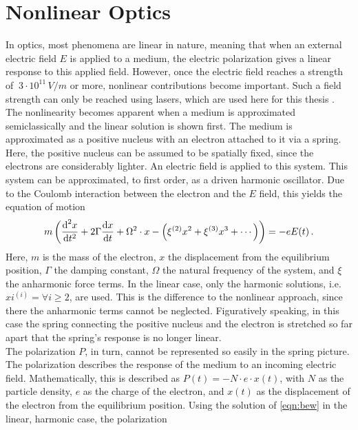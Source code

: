 \section{Nonlinear Optics}
\label{sec:NLO}
In optics, most phenomena are linear in nature, meaning that when an external electric field
$E$ is applied to a medium, the electric polarization gives a linear response to this applied
field.
However, once the electric field reaches a strength of $~3\cdot10^{11}\,\unit{V/m}$ or more,
nonlinear contributions become important.
Such a field strength can only be reached using lasers, which are used here for this
thesis \cite{Butcher_Cotter_1990}.
The nonlinearity becomes apparent when a medium is approximated semiclassically and the linear
solution is shown first.
The medium is approximated as a positive nucleus with an electron attached to it via a spring.
Here, the positive nucleus can be assumed to be spatially fixed, since the electrons are
considerably lighter.
An electric field is applied to this system.
This system can be approximated, to first order, as a driven harmonic oscillator.
Due to the Coulomb interaction between the electron and the $E$ field, this yields the
equation of motion
\begin{equation}
    \label{eqn:bew}
    m\left(\frac{\text d^2x}{\text d t^2}+2\Gamma \frac{\text d x}{\text d t}+\Omega^2\cdot x-\left(\xi^{(2)}x^2+\xi^{(3)}x^3+\dotsb\right)\right)= -e E(t)\,.
\end{equation}
Here, $m$ is the mass of the electron, $x$ the displacement from the equilibrium position,
$\Gamma$ the damping constant,
$\Omega$ the natural frequency of the system, and $\xi$ the anharmonic force terms.
In the linear case, only the harmonic solutions, i.e. $xi^{(i)}= \forall i \ge 2$, are used.
This is the difference to the nonlinear approach, since there the anharmonic terms cannot
be neglected.
Figuratively speaking, in this case the spring connecting the positive nucleus and the electron
is stretched so far apart that the spring's response is no longer linear.\\
The polarization $P$, in turn, cannot be represented so easily in the spring picture.
The polarization describes the response of the medium to an
incoming electric field.
Mathematically, this is described as $P(t)= -N\cdot e\cdot x(t)$, with $N$ as the particle
density, $e$ as the charge of the electron, and $x(t)$ as the displacement of the electron
from the equilibrium position.
Using the solution of \eqref{eqn:bew} in the linear, harmonic case, the polarization
